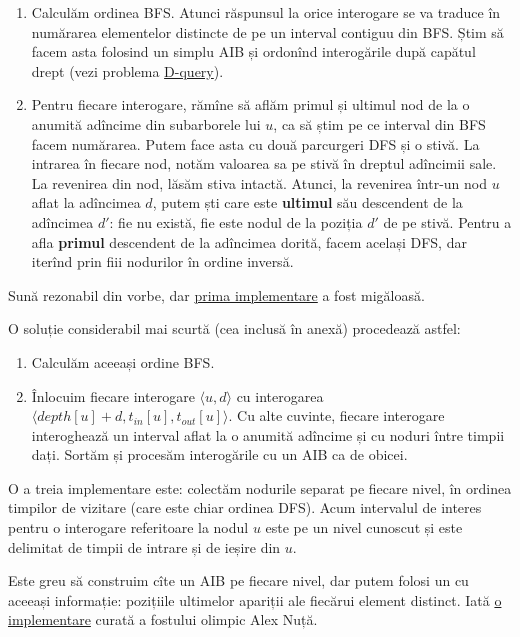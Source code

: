 \documentclass[../main.tex]{subfiles}
\begin{document}
\begin{enumerate}
  \item Calculăm ordinea BFS. Atunci răspunsul la orice interogare se va traduce în numărarea elementelor distincte de pe un interval contiguu din BFS. Știm să facem asta folosind un simplu AIB și ordonînd interogările după capătul drept (vezi problema \hyperref[problem:dquery-fenwick]{D-query}).

  \item Pentru fiecare interogare, rămîne să aflăm primul și ultimul nod de la o anumită adîncime din subarborele lui $u$, ca să știm pe ce interval din BFS facem numărarea. Putem face asta cu două parcurgeri DFS și o stivă. La intrarea în fiecare nod, notăm valoarea sa pe stivă în dreptul adîncimii sale. La revenirea din nod, lăsăm stiva intactă. Atunci, la revenirea într-un nod $u$ aflat la adîncimea $d$, putem ști care este \textbf{ultimul} său descendent de la adîncimea $d'$: fie nu există, fie este nodul de la poziția $d'$ de pe stivă. Pentru a afla \textbf{primul} descendent de la adîncimea dorită, facem același DFS, dar iterînd prin fiii nodurilor în ordine inversă.
\end{enumerate}

Sună rezonabil din vorbe, dar \href{https://codeforces.com/contest/246/submission/294410845}{prima implementare} a fost migăloasă.

O soluție considerabil mai scurtă (cea inclusă în anexă) procedează astfel:

\begin{enumerate}
  \item Calculăm aceeași ordine BFS.

  \item Înlocuim fiecare interogare $\langle u, d \rangle$ cu interogarea $\langle depth[u] + d, t_{in}[u], t_{out}[u]\rangle$. Cu alte cuvinte, fiecare interogare interoghează un interval aflat la o anumită adîncime și cu noduri între timpii dați. Sortăm și procesăm interogările cu un AIB ca de obicei.
\end{enumerate}

O a treia implementare este: colectăm nodurile separat pe fiecare nivel, în ordinea timpilor de vizitare (care este chiar ordinea DFS). Acum intervalul de interes pentru o interogare referitoare la nodul $u$ este pe un nivel cunoscut și este delimitat de timpii de intrare și de ieșire din $u$.

Este greu să construim cîte un AIB pe fiecare nivel, dar putem folosi un  cu aceeași informație: pozițiile ultimelor apariții ale fiecărui element distinct. Iată \href{https://codeforces.com/contest/246/submission/300415656}{o implementare} curată a fostului olimpic Alex Nuță.
\end{document}
